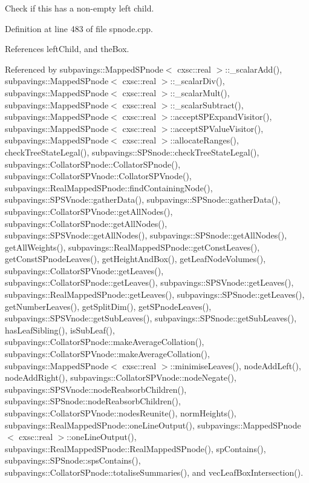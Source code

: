 \-Check if this has a non-\/empty left child. 



\-Definition at line 483 of file spnode.\-cpp.



\-References left\-Child, and the\-Box.



\-Referenced by subpavings\-::\-Mapped\-S\-Pnode$<$ cxsc\-::real $>$\-::\-\_\-scalar\-Add(), subpavings\-::\-Mapped\-S\-Pnode$<$ cxsc\-::real $>$\-::\-\_\-scalar\-Div(), subpavings\-::\-Mapped\-S\-Pnode$<$ cxsc\-::real $>$\-::\-\_\-scalar\-Mult(), subpavings\-::\-Mapped\-S\-Pnode$<$ cxsc\-::real $>$\-::\-\_\-scalar\-Subtract(), subpavings\-::\-Mapped\-S\-Pnode$<$ cxsc\-::real $>$\-::accept\-S\-P\-Expand\-Visitor(), subpavings\-::\-Mapped\-S\-Pnode$<$ cxsc\-::real $>$\-::accept\-S\-P\-Value\-Visitor(), subpavings\-::\-Mapped\-S\-Pnode$<$ cxsc\-::real $>$\-::allocate\-Ranges(), check\-Tree\-State\-Legal(), subpavings\-::\-S\-P\-Snode\-::check\-Tree\-State\-Legal(), subpavings\-::\-Collator\-S\-Pnode\-::\-Collator\-S\-Pnode(), subpavings\-::\-Collator\-S\-P\-Vnode\-::\-Collator\-S\-P\-Vnode(), subpavings\-::\-Real\-Mapped\-S\-Pnode\-::find\-Containing\-Node(), subpavings\-::\-S\-P\-S\-Vnode\-::gather\-Data(), subpavings\-::\-S\-P\-Snode\-::gather\-Data(), subpavings\-::\-Collator\-S\-P\-Vnode\-::get\-All\-Nodes(), subpavings\-::\-Collator\-S\-Pnode\-::get\-All\-Nodes(), subpavings\-::\-S\-P\-S\-Vnode\-::get\-All\-Nodes(), subpavings\-::\-S\-P\-Snode\-::get\-All\-Nodes(), get\-All\-Weights(), subpavings\-::\-Real\-Mapped\-S\-Pnode\-::get\-Const\-Leaves(), get\-Const\-S\-Pnode\-Leaves(), get\-Height\-And\-Box(), get\-Leaf\-Node\-Volumes(), subpavings\-::\-Collator\-S\-P\-Vnode\-::get\-Leaves(), subpavings\-::\-Collator\-S\-Pnode\-::get\-Leaves(), subpavings\-::\-S\-P\-S\-Vnode\-::get\-Leaves(), subpavings\-::\-Real\-Mapped\-S\-Pnode\-::get\-Leaves(), subpavings\-::\-S\-P\-Snode\-::get\-Leaves(), get\-Number\-Leaves(), get\-Split\-Dim(), get\-S\-Pnode\-Leaves(), subpavings\-::\-S\-P\-S\-Vnode\-::get\-Sub\-Leaves(), subpavings\-::\-S\-P\-Snode\-::get\-Sub\-Leaves(), has\-Leaf\-Sibling(), is\-Sub\-Leaf(), subpavings\-::\-Collator\-S\-Pnode\-::make\-Average\-Collation(), subpavings\-::\-Collator\-S\-P\-Vnode\-::make\-Average\-Collation(), subpavings\-::\-Mapped\-S\-Pnode$<$ cxsc\-::real $>$\-::minimise\-Leaves(), node\-Add\-Left(), node\-Add\-Right(), subpavings\-::\-Collator\-S\-P\-Vnode\-::node\-Negate(), subpavings\-::\-S\-P\-S\-Vnode\-::node\-Reabsorb\-Children(), subpavings\-::\-S\-P\-Snode\-::node\-Reabsorb\-Children(), subpavings\-::\-Collator\-S\-P\-Vnode\-::nodes\-Reunite(), norm\-Heights(), subpavings\-::\-Real\-Mapped\-S\-Pnode\-::one\-Line\-Output(), subpavings\-::\-Mapped\-S\-Pnode$<$ cxsc\-::real $>$\-::one\-Line\-Output(), subpavings\-::\-Real\-Mapped\-S\-Pnode\-::\-Real\-Mapped\-S\-Pnode(), sp\-Contains(), subpavings\-::\-S\-P\-Snode\-::sps\-Contains(), subpavings\-::\-Collator\-S\-Pnode\-::totalise\-Summaries(), and vec\-Leaf\-Box\-Intersection().


